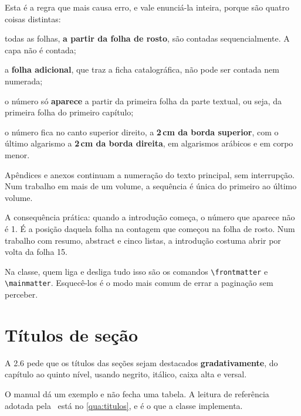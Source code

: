 \documentclass[dsc]{ufrj}
\begin{document}
  Esta é a regra que mais causa erro, e vale enunciá-la inteira, porque são
  quatro coisas distintas:

  \begin{alineas}
    \item todas as folhas, \textbf{a partir da folha de rosto}, são contadas
      sequencialmente. A capa não é contada;
    \item a \textbf{folha adicional}, que traz a ficha catalográfica, não pode
      ser contada nem numerada;
    \item o número só \textbf{aparece} a partir da primeira folha da parte
      textual, ou seja, da primeira folha do primeiro capítulo;
    \item o número fica no canto superior direito, a \textbf{2\,cm da borda
      superior}, com o último algarismo a \textbf{2\,cm da borda direita}, em
      algarismos arábicos e em corpo menor.
  \end{alineas}

  Apêndices e anexos continuam a numeração do texto principal, sem interrupção.
  Num trabalho em mais de um volume, a sequência é única do primeiro ao último
  volume.

  A consequência prática: quando a introdução começa, o número que aparece não é
  1. É a posição daquela folha na contagem que começou na folha de rosto. Num
  trabalho com resumo, abstract e cinco listas, a introdução costuma abrir por
  volta da folha 15.

  Na classe, quem liga e desliga tudo isso são os comandos \verb|\frontmatter| e
  \verb|\mainmatter|. Esquecê-los é o modo mais comum de errar a paginação sem
  perceber.

  \section{Títulos de seção}\label{sec:titulos}

  A 2.6 pede que os títulos das seções sejam destacados \textbf{gradativamente},
  do capítulo ao quinto nível, usando negrito, itálico, caixa alta e versal.

  O manual dá um exemplo e não fecha uma tabela. A leitura de referência adotada
  pela \CoppeTeX\ está no \autoref{qua:titulos}, e é o que a classe implementa.
\end{document}
